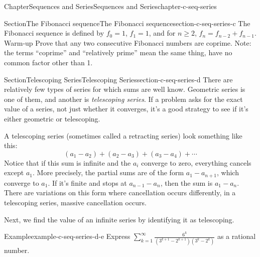 \documentclass[oneside,10pt,]{book}
\numberwithin{equation}{section}
\begin{document}
\begin{chapterptx}{Chapter}{Sequences and Series}{}{Sequences and Series}{}{}{chapter-c-seq-series}
\renewcommand*{\chaptername}{Chapter}
\begin{introduction}{}%
%
\end{introduction}%
%
%
\typeout{************************************************}
\typeout{************************************************}
%
\begin{sectionptx}{Section}{The Fibonacci sequence}{}{The Fibonacci sequence}{}{}{section-c-seq-series-c}
%
The Fibonacci sequence is defined by  \(f_0=1\), \(f_1= 1\), and for \(n\geq 2\), \(f_n= f_{n-2}+f_{n-1}\). Warm-up  Prove that any two consecutive Fibonacci numbers are coprime.  Note:  the terms  ``coprime''  and   ``relatively prime'' mean the same thing, have no common factor other than 1.%
\end{sectionptx}
%
%
\typeout{************************************************}
\typeout{************************************************}
%
\begin{sectionptx}{Section}{Telescoping Series}{}{Telescoping Series}{}{}{section-c-seq-series-d}
There are relatively few types of series for which sums are well know.  Geometric series is one of them, and another is \emph{telescoping series}.  If a problem asks for the exact value of a series, not just whether it converges, it's a good strategy to see if it's either geometric or telescoping.%
\par
A telescoping series (sometimes called a retracting series) look something like this:%
\begin{equation*}
(a_1-a_2)+(a_2-a_3)+(a_3-a_4)+\cdots
\end{equation*}
Notice that if this sum is infinite and the \(a_i\) converge to zero, everything cancels except \(a_1\). More precisely, the partial sums are of the form \(a_1-a_{n+1}\), which converge to \(a_1\).  If it's finite and stops at \(a_{n-1}-a_n\), then the sum is \(a_{1}-a_n\).  There are variations on this form where cancellation occurs differently, in a telescoping series, massive cancellation occurs.%
\par
Next, we find the value of an infinite series by identifying it as telescoping.%
\begin{example}{Example}{}{example-c-seq-series-d-e}%
Express \(\sum _{k=1}^{\infty } \frac{6^k}{\left(3^{k+1}-2^{k+1}\right) \left(3^k-2^k\right)}\) as a rational number.%

\end{example}
\end{sectionptx}
\end{chapterptx}
\end{document}
